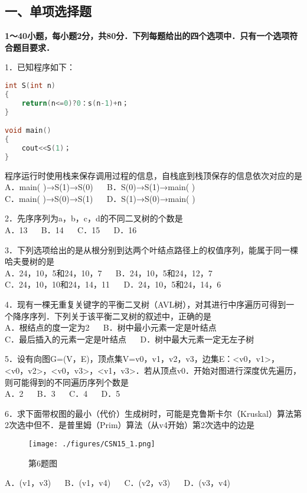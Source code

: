 
\subsection{一、单项选择题}
\textbf{1～40小题，每小题2分，共80分．下列每题给出的四个选项中．只有一个选项符合题目要求．}

1．已知程序如下： \\
\begin{lstlisting}[language=cpp]
int S(int n)
{
    return(n<=0)?0：s(n-1)+n；
}

void main()
{ 
    cout<<S(1)；
}
\end{lstlisting}
程序运行时使用栈来保存调用过程的信息，自栈底到栈顶保存的信息依次对应的是 \\
A．main( )→S(1)→S(0) $\quad$ B．S(0)→S(1)→main( ) \\
C．main( )→S(0)→S(1) $\quad$ D．S(1)→S(0)→main( )

2．先序序列为a，b，c，d的不同二叉树的个数是 \\
A．13 $\quad$ B．14 $\quad$ C．15 $\quad$ D．16

3．下列选项给出的是从根分别到达两个叶结点路径上的权值序列，能属于同一棵哈夫曼树的是 \\
A．24，10，5和24，10，7 $\quad$ B．24，10，5和24，12，7 \\
C．24，10，10和24，14，11 $\quad$ D．24，10，5和24，14，6

4．现有一棵无重复关键字的平衡二叉树（AVL树），对其进行中序遍历可得到一个降序序列．下列关于该平衡二叉树的叙述中，正确的是 \\
A．根结点的度一定为2 $\quad$ B．树中最小元素一定是叶结点 \\
C．最后插入的元素一定是叶结点 $\quad$ D．树中最大元素一定无左子树

5．设有向图G=(V，E)，顶点集V={v0，v1，v2，v3}，边集E：{<v0，v1>，<v0，v2>，<v0，v3>，<v1，v3>}．若从顶点v0．开始对图进行深度优先遍历，则可能得到的不同遍历序列个数是 \\
A．2 $\quad$ B．3 $\quad$ C．4 $\quad$ D．5

6．求下面带权图的最小（代价）生成树时，可能是克鲁斯卡尔（Kruskal）算法第2次选中但不．是普里姆（Prim）算法（从v4开始）第2次选中的边是
\begin{figure}[ht]
\centering
\texttt{[image: ./figures/CSN15\_1.png]}
\caption{第6题图} \label{CSN15_fig1}
\end{figure}
A．(v1，v3) $\quad$ B．(v1，v4) $\quad$ C．(v2，v3) $\quad$ D．(v3，v4)


